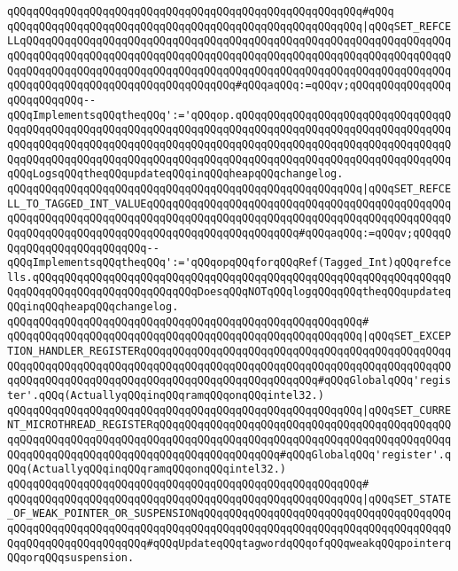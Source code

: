 \verb|qQQqqQQqqQQqqQQqqQQqqQQqqQQqqQQqqQQqqQQqqQQqqQQqqQQqqQQq#qQQq|\newline
\verb|qQQqqQQqqQQqqQQqqQQqqQQqqQQqqQQqqQQqqQQqqQQqqQQqqQQqqQQq|\verb#|qQQqSET_REFCELLqQQqqQQqqQQqqQQqqQQqqQQqqQQqqQQqqQQqqQQqqQQqqQQqqQQqqQQqqQQqqQQqqQQqqQQqqQQqqQQqqQQqqQQqqQQqqQQqqQQqqQQqqQQqqQQqqQQqqQQqqQQqqQQqqQQqqQQqqQQqqQQqqQQqqQQqqQQqqQQqqQQqqQQqqQQqqQQqqQQqqQQqqQQqqQQqqQQqqQQqqQQqqQQqqQQqqQQqqQQqqQQqqQQqqQQqqQQqqQQqqQQq#\verb|#qQQqaqQQq:=qQQqv;qQQqqQQqqQQqqQQqqQQqqQQqqQQq--qQQqImplementsqQQqtheqQQq':='qQQqop.qQQqqQQqqQQqqQQqqQQqqQQqqQQqqQQqqQQqqQQqqQQqqQQqqQQqqQQqqQQqqQQqqQQqqQQqqQQqqQQqqQQqqQQqqQQqqQQqqQQqqQQqqQQqqQQqqQQqqQQqqQQqqQQqqQQqqQQqqQQqqQQqqQQqqQQqqQQqqQQqqQQqqQQqqQQqqQQqqQQqqQQqqQQqqQQqqQQqqQQqqQQqqQQqqQQqqQQqqQQqqQQqqQQqqQQqqQQqqQQqqQQqqQQqLogsqQQqtheqQQqupdateqQQqinqQQqheapqQQqchangelog.|\newline
\verb|qQQqqQQqqQQqqQQqqQQqqQQqqQQqqQQqqQQqqQQqqQQqqQQqqQQqqQQq|\verb#|qQQqSET_REFCELL_TO_TAGGED_INT_VALUEqQQqqQQqqQQqqQQqqQQqqQQqqQQqqQQqqQQqqQQqqQQqqQQqqQQqqQQqqQQqqQQqqQQqqQQqqQQqqQQqqQQqqQQqqQQqqQQqqQQqqQQqqQQqqQQqqQQqqQQqqQQqqQQqqQQqqQQqqQQqqQQqqQQqqQQqqQQqqQQqqQQq#\verb|#qQQqaqQQq:=qQQqv;qQQqqQQqqQQqqQQqqQQqqQQqqQQq--qQQqImplementsqQQqtheqQQq':='qQQqopqQQqforqQQqRef(Tagged_Int)qQQqrefcells.qQQqqQQqqQQqqQQqqQQqqQQqqQQqqQQqqQQqqQQqqQQqqQQqqQQqqQQqqQQqqQQqqQQqqQQqqQQqqQQqqQQqqQQqqQQqqQQqDoesqQQqNOTqQQqlogqQQqqQQqtheqQQqupdateqQQqinqQQqheapqQQqchangelog.|\newline
\verb|qQQqqQQqqQQqqQQqqQQqqQQqqQQqqQQqqQQqqQQqqQQqqQQqqQQqqQQq#|\newline
\verb|qQQqqQQqqQQqqQQqqQQqqQQqqQQqqQQqqQQqqQQqqQQqqQQqqQQqqQQq|\verb#|qQQqSET_EXCEPTION_HANDLER_REGISTERqQQqqQQqqQQqqQQqqQQqqQQqqQQqqQQqqQQqqQQqqQQqqQQqqQQqqQQqqQQqqQQqqQQqqQQqqQQqqQQqqQQqqQQqqQQqqQQqqQQqqQQqqQQqqQQqqQQqqQQqqQQqqQQqqQQqqQQqqQQqqQQqqQQqqQQqqQQqqQQqqQQqqQQq#\verb|#qQQqGlobalqQQq'register'.qQQq(ActuallyqQQqinqQQqramqQQqonqQQqintel32.)|\newline
\verb|qQQqqQQqqQQqqQQqqQQqqQQqqQQqqQQqqQQqqQQqqQQqqQQqqQQqqQQq|\verb#|qQQqSET_CURRENT_MICROTHREAD_REGISTERqQQqqQQqqQQqqQQqqQQqqQQqqQQqqQQqqQQqqQQqqQQqqQQqqQQqqQQqqQQqqQQqqQQqqQQqqQQqqQQqqQQqqQQqqQQqqQQqqQQqqQQqqQQqqQQqqQQqqQQqqQQqqQQqqQQqqQQqqQQqqQQqqQQqqQQqqQQqqQQq#\verb|#qQQqGlobalqQQq'register'.qQQq(ActuallyqQQqinqQQqramqQQqonqQQqintel32.)|\newline
\verb|qQQqqQQqqQQqqQQqqQQqqQQqqQQqqQQqqQQqqQQqqQQqqQQqqQQqqQQq#|\newline
\verb|qQQqqQQqqQQqqQQqqQQqqQQqqQQqqQQqqQQqqQQqqQQqqQQqqQQqqQQq|\verb#|qQQqSET_STATE_OF_WEAK_POINTER_OR_SUSPENSIONqQQqqQQqqQQqqQQqqQQqqQQqqQQqqQQqqQQqqQQqqQQqqQQqqQQqqQQqqQQqqQQqqQQqqQQqqQQqqQQqqQQqqQQqqQQqqQQqqQQqqQQqqQQqqQQqqQQqqQQqqQQqqQQqqQQq#\verb|#qQQqUpdateqQQqtagwordqQQqofqQQqweakqQQqpointerqQQqorqQQqsuspension.|\newline

